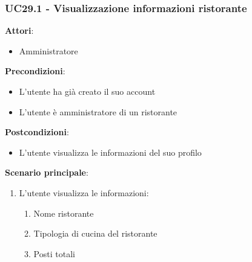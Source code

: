 \subsubsection{UC29.1 - Visualizzazione informazioni ristorante}\label{usecase:29_1}
\textbf{Attori}:
\begin{itemize}
    \item Amministratore
\end{itemize}
\textbf{Precondizioni}:
\begin{itemize}
    \item L'utente ha già creato il suo account
    \item L'utente è amministratore di un ristorante
\end{itemize}
\textbf{Postcondizioni}:
\begin{itemize}
    \item L'utente visualizza le informazioni del suo profilo
\end{itemize}
\textbf{Scenario principale}:
\begin{enumerate}
    \item L'utente visualizza le informazioni:
    \begin{enumerate}
        \item Nome ristorante
        \item Tipologia di cucina del ristorante
        \item Posti totali
    \end{enumerate}
\end{enumerate}